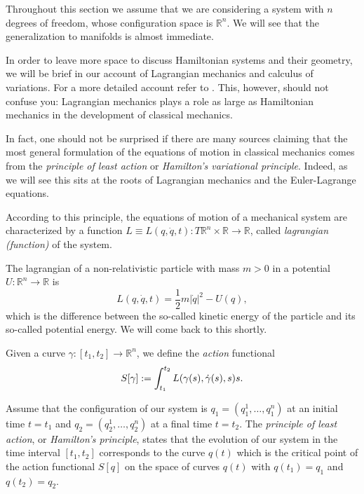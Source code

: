 \documentclass[english,fontsize=11pt,paper=a5,oneside]{scrbook}
\newcommand{\R}{\mathbb{R}}
\let\d\relax
\DeclareMathOperator{\d}{d}
\theoremstyle{definition}
\newenvironment{example}
  {\pushQED{\qed}\renewcommand{\qedsymbol}{$\lozenge$}\examplex}
  {\popQED\endexamplex}
\begin{document}
Throughout this section we assume that we are considering a system with $n$ degrees of freedom, whose configuration space is $\R^n$.
We will see that the generalization to manifolds is almost immediate.

In order to leave more space to discuss Hamiltonian systems and their geometry, we will be brief in our account of Lagrangian mechanics and calculus of variations. For a more detailed account refer to \cite[Part II]{book:arnold}.
This, however, should not confuse you: Lagrangian mechanics plays a role as large as Hamiltonian mechanics in the development of classical mechanics.

In fact, one should not be surprised if there are many sources claiming that the most general formulation of the equations of motion in classical mechanics comes from the \emph{principle of least action} or \emph{Hamilton's variational principle}. Indeed, as we will see this sits at the roots of Lagrangian mechanics and the Euler-Lagrange equations.

According to this principle, the equations of motion of a mechanical system are characterized by a function $L \equiv L(q, \dot q, t) : T\R^n \times \R \to \R$, called \emph{lagrangian (function)} of the system.

\begin{example}
    The lagrangian of a non-relativistic particle with mass $m > 0$ in a potential $U : \R^n \to \R$ is
    \begin{equation}
        L(q, \dot q, t) = \frac12 m |\dot q|^2 - U(q),
    \end{equation}
    which is the difference between the so-called kinetic energy of the particle and its so-called potential energy.
    We will come back to this shortly.
\end{example}

Given a curve $\gamma:[t_1, t_2] \to \R^n$, we define the \emph{action} functional
\begin{equation}\label{eq:Laction}
    S[\gamma] := \int_{t_1}^{t_2} L(\gamma(s), \dot \gamma(s), s) \d s.
\end{equation}

\begin{tcolorbox}
    Assume that the configuration of our system is $q_1 = (q_1^1, \ldots, q_1^n)$ at an initial time $t=t_1$ and $q_2 = (q_2^1, \ldots, q_2^n)$ at a final time $t = t_2$. The \emph{principle of least action}, or \emph{Hamilton's principle}, states that the evolution of our system in the time interval $[t_1, t_2]$ corresponds to the curve $q(t)$ which is the critical point of the action functional $S[q]$ on the space of curves $q(t)$ with $q(t_1) = q_1$ and $q(t_2) = q_2$.
\end{tcolorbox}
\end{document}
